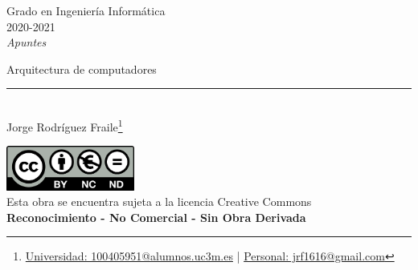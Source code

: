\documentclass[12pt, twoside, openright]{report} %
\begin{document}

\begin{titlepage}
	\begin{sffamily}
		\color{azulUC3M}
		\begin{center}
			\begin{figure}[H] %
			\end{figure}
			\vspace{2.5cm}
			\begin{Large}
				Grado en Ingeniería Informática\\
				2020-2021\\
				\vspace{2cm}
				\textsl{Apuntes}\\
				\bigskip
			\end{Large}
			{\Huge Arquitectura de computadores}\\
			\vspace*{0.5cm}
			\rule{10.5cm}{0.1mm}\\
			\vspace*{0.9cm}
			{\LARGE Jorge Rodríguez Fraile\footnote{\href{mailto:100405951@alumnos.uc3m.es}{Universidad: 100405951@alumnos.uc3m.es}  |  \href{mailto:jrf1616@gmail.com}{Personal: jrf1616@gmail.com}}}\\
			\vspace*{1cm}
		\end{center}
		\vfill
		\color{black}
		\includegraphics[width=4.2cm]{img/creativecommons.png}\\
		Esta obra se encuentra sujeta a la licencia Creative Commons\\ \textbf{Reconocimiento - No Comercial - Sin Obra Derivada}
	\end{sffamily}
\end{titlepage}


\tableofcontents
\thispagestyle{fancy}
\end{document}
